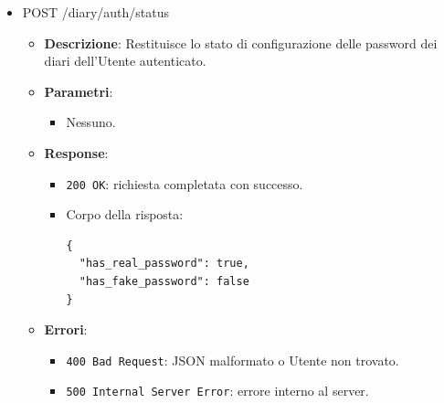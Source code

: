 \documentclass[a4paper,12pt]{article}
\newcommand{\code}[1]{{\ttfamily\textcolor{purple!85!black}{#1}}}
\begin{document}
\begin{itemize}
\begin{itemize}
            \item \textbf{Response}:
            \begin{itemize}
                \item \texttt{200 OK}: password impostata correttamente.
                \item Corpo della risposta:
\begin{verbatim}
{
  "message": "Password set successfully"
}
\end{verbatim}
            \end{itemize}

            \item \textbf{Errori}:
            \begin{itemize}
                \item \texttt{400 Bad Request}: \texttt{diary\_type} non valido, password non conforme ai requisiti di sicurezza, password mancante o precedente errata, JSON malformato o campi mancanti.
                \item \texttt{500 Internal Server Error}: errore di persistenza della password.
            \end{itemize}
        \end{itemize}

\item \code{POST /diary/auth/status}
        \begin{itemize}
            \item \textbf{Descrizione}: Restituisce lo stato di configurazione delle password dei diari dell’Utente autenticato.

            \item \textbf{Parametri}:
            \begin{itemize}
                \item Nessuno.
            \end{itemize}

            \item \textbf{Response}:
            \begin{itemize}
                \item \texttt{200 OK}: richiesta completata con successo.
                \item Corpo della risposta:
\begin{verbatim}
{
  "has_real_password": true,
  "has_fake_password": false
}
\end{verbatim}
            \end{itemize}

            \item \textbf{Errori}:
            \begin{itemize}
                \item \texttt{400 Bad Request}: JSON malformato o Utente non trovato.
                \item \texttt{500 Internal Server Error}: errore interno al server.
            \end{itemize}
        \end{itemize}


\end{itemize}
\end{document}
